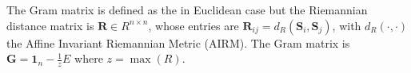 The Gram matrix is defined as the in Euclidean case but the Riemannian distance matrix is $\boldsymbol{R} \in R^{n\times n}$, whose entries are $\boldsymbol{R}_{ij} = d_R(\boldsymbol{S}_i, \boldsymbol{S}_j)$, with $d_R(\cdot, \cdot)$ the Affine Invariant Riemannian Metric (AIRM).
The Gram matrix is $\boldsymbol{G} = \mathbf{1}_n - \frac{1}{z}E$ where $z=\operatorname{max}(R)$.